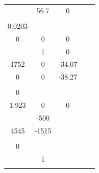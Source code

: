 \documentclass[runningheads,a4paper]{llncs}
\begin{document}
\begin{table}[htb]
\begin{tabular}{|c|c|c|c|c|}
\begin{array}{ccc}
0		& 56.7		& 0		\\
\end{array}\right]$ & $\left[\begin{array}{c}
0.232 \\ 0.0203 \\ 0
\end{array}\right]$ & $\left[\begin{array}{ccc}
1 & 0 & 0\\
\end{array}\right]$ & 0 \\ \hline
\begin{tabular}[c]{@{}c@{}}Ball\\ Magnetic\\ Levitation\end{tabular} & $\left[\begin{array}{ccc}
0		& 1 		& 0		\\
1752	& 0			& -34.07\\
0		& 0			& -38.27\\
\end{array}\right]$ & $\left[\begin{array}{c}
0 \\ 0 \\ 1.923
\end{array}\right]$ & $\left[\begin{array}{ccc}
1 & 0 & 0\\
\end{array}\right]$ & 0 \\ \hline
\begin{tabular}[c]{@{}c@{}}Buck\\ Converter\end{tabular}                      & $\left[\begin{array}{cc}
0		& -500 \\
4545	& -1515\\
\end{array}\right]$ & $\left[\begin{array}{c}
125 \\ 0 \\
\end{array}\right]$ & $\left[\begin{array}{cc}
 0 & 1\\
\end{array}\right]$ & 0 \\ \hline
\begin{tabular}[c]{@{}c@{}}Boost\\ Converter\end{tabular} & $\left[\begin{array}{cc}

\end{array}
\end{tabular}
\end{table}
\end{document}
